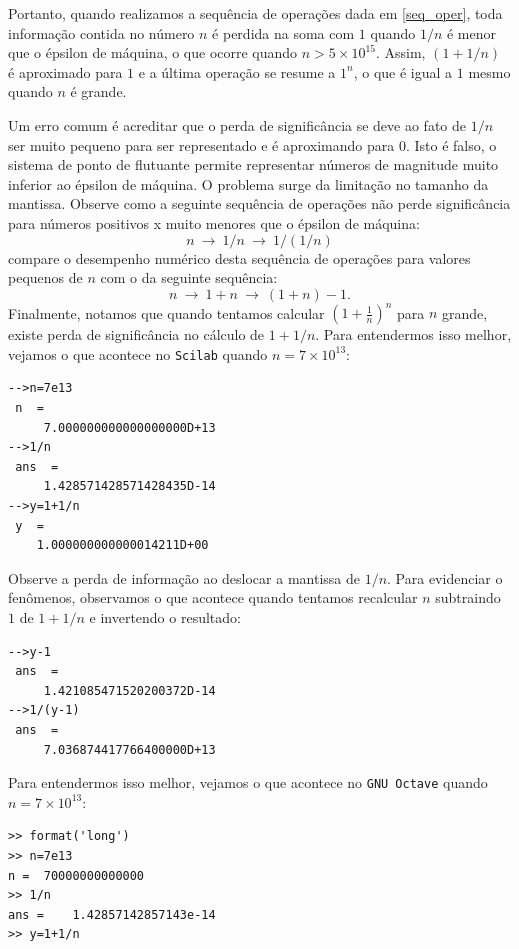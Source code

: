 \begin{ex}
Portanto, quando realizamos a sequência de operações dada em \eqref{seq_oper}, toda informação contida no número $n$ é perdida na soma com $1$ quando $1/n$ é menor que o épsilon de máquina, o que ocorre quando $n>5\times 10^{15}$. Assim, $(1+1/n)$ é aproximado para $1$ e a última operação se resume a $1^n$, o que é igual a $1$ mesmo quando $n$ é grande.

Um erro comum é acreditar que o perda de significância se deve ao fato de $1/n$ ser muito pequeno para ser representado e é aproximando para $0$. Isto é falso, o sistema de ponto de flutuante permite representar números de magnitude muito inferior ao épsilon de máquina. O problema surge da limitação no tamanho da mantissa. Observe como a seguinte sequência de operações não perde significância para números positivos x muito menores que o épsilon de máquina:
\begin{equation}\label{seq_oper2}
n ~\to ~1/n ~\to ~1/(1/n) 
\end{equation}
compare o desempenho numérico desta sequência de operações para valores pequenos de $n$ com o da seguinte sequência:
\begin{equation}\label{seq_oper3}
n ~\to ~1+n ~\to ~(1+n)-1.
\end{equation}
Finalmente, notamos que quando tentamos calcular $\left(1+\frac{1}{n}\right)^n$ para $n$ grande, existe perda de significância no cálculo de $1+1/n$. 
\ifisscilab
Para entendermos isso melhor, vejamos o que acontece no \verb+Scilab+ quando $n=7\times 10^{13}$:
\begin{verbatim}
-->n=7e13
 n  =
     7.000000000000000000D+13  
-->1/n
 ans  =
     1.428571428571428435D-14   
-->y=1+1/n
 y  =
    1.000000000000014211D+00  
\end{verbatim}
Observe a perda de informação ao deslocar a mantissa de $1/n$. Para evidenciar o fenômenos, observamos o que acontece quando tentamos recalcular $n$ subtraindo $1$ de $1+1/n$ e invertendo o resultado:
\begin{verbatim}
-->y-1
 ans  =
     1.421085471520200372D-14   
-->1/(y-1)
 ans  =
     7.036874417766400000D+13  
\end{verbatim}
\fi
\ifisoctave
Para entendermos isso melhor, vejamos o que acontece no \verb+GNU Octave+ quando $n=7\times 10^{13}$:
\begin{verbatim}
>> format('long')
>> n=7e13
n =  70000000000000
>> 1/n
ans =    1.42857142857143e-14
>> y=1+1/n

\end{verbatim}
\end{ex}
